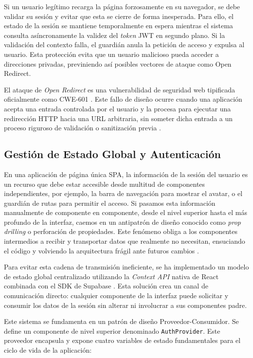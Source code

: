 \documentclass[11pt, a4paper]{report}
\theoremstyle{definition}
\begin{document}
Si un usuario legítimo recarga la página forzosamente en su navegador, se debe validar su sesión y evitar que esta se cierre de forma inesperada. Para ello, el estado de la sesión se mantiene temporalmente en espera mientras el sistema consulta asíncronamente la validez del \textit{token} JWT en segundo plano. Si la validación del contexto falla, el guardián anula la petición de acceso y expulsa al usuario. Esta protección evita que un usuario malicioso pueda acceder a direcciones privadas, previniendo así posibles vectores de ataque como Open Redirect.

El ataque de \textit{Open Redirect} es una vulnerabilidad de seguridad web tipificada oficialmente como CWE-601 \cite{cwe601}. Este fallo de diseño ocurre cuando una aplicación acepta una entrada controlada por el usuario y la procesa para ejecutar una redirección HTTP hacia una URL arbitraria, sin someter dicha entrada a un proceso riguroso de validación o sanitización previa \cite{owasp_open_redirect}.

\subsection{Gestión de Estado Global y Autenticación}
\label{subsec:gestion_estado_autenticacion}

En una aplicación de página única SPA, la información de la sesión del usuario es un recurso que debe estar accesible desde multitud de componentes independientes, por ejemplo, la barra de navegación para mostrar el avatar, o el guardián de rutas para permitir el acceso. Si pasamos esta información manualmente de componente en componente, desde el nivel superior hasta el más profundo de la interfaz, caemos en un antipatrón de diseño conocido como \textit{prop drilling} o perforación de propiedades. Este fenómeno obliga a los componentes intermedios a recibir y transportar datos que realmente no necesitan, ensuciando el código y volviendo la arquitectura frágil ante futuros cambios \cite{react_prop_drilling}.

Para evitar esta cadena de transmisión ineficiente, se ha implementado un modelo de estado global centralizado utilizando la \textit{Context API} nativa de React combinada con el SDK de Supabase \cite{supabase_auth_reference}. Esta solución crea un canal de comunicación directo: cualquier componente de la interfaz puede solicitar y consumir los datos de la sesión sin alterar ni involucrar a sus componentes padre.

Este sistema se fundamenta en un patrón de diseño Proveedor-Consumidor. Se define un componente de nivel superior denominado \texttt{AuthProvider}. Este proveedor encapsula y expone cuatro variables de estado fundamentales para el ciclo de vida de la aplicación:
\end{document}
